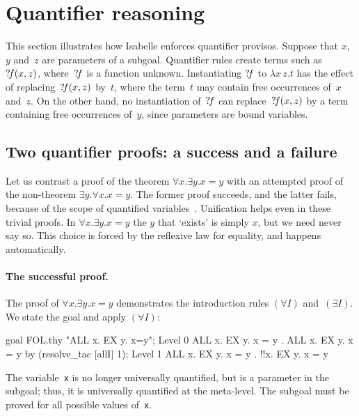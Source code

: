 \section{Quantifier reasoning}
This section illustrates how Isabelle enforces quantifier provisos.
Suppose that $x$, $y$ and~$z$ are parameters of a subgoal.  Quantifier
rules create terms such as~${?\!f}(x,z)$, where~${?\!f}$ is a function
unknown.  Instantiating ${?\!f}$ to $\lambda x\,z.t$ has the effect of
replacing~${?\!f}(x,z)$ by~$t$, where the term~$t$ may contain free
occurrences of~$x$ and~$z$.  On the other hand, no instantiation
of~${?\!f}$ can replace~${?\!f}(x,z)$ by a term containing free
occurrences of~$y$, since parameters are bound variables.

\subsection{Two quantifier proofs: a success and a failure}
Let us contrast a proof of the theorem $\forall x.\exists y.x=y$ with an
attempted proof of the non-theorem $\exists y.\forall x.x=y$.  The former
proof succeeds, and the latter fails, because of the scope of quantified
variables~\cite{paulson-found}.  Unification helps even in these trivial
proofs. In $\forall x.\exists y.x=y$ the $y$ that `exists' is simply $x$,
but we need never say so. This choice is forced by the reflexive law for
equality, and happens automatically.

\paragraph{The successful proof.}
The proof of $\forall x.\exists y.x=y$ demonstrates the introduction rules
$(\forall I)$ and~$(\exists I)$.  We state the goal and apply $(\forall I)$:
\begin{ttbox}
goal FOL.thy "ALL x. EX y. x=y";
{\out Level 0}
{\out ALL x. EX y. x = y}
{. ALL x. EX y. x = y}
\ttbreak
by (resolve_tac [allI] 1);
{\out Level 1}
{\out ALL x. EX y. x = y}
{. !!x. EX y. x = y}
\end{ttbox}
The variable~{\tt x} is no longer universally quantified, but is a
parameter in the subgoal; thus, it is universally quantified at the
meta-level.  The subgoal must be proved for all possible values of~{\tt x}.

